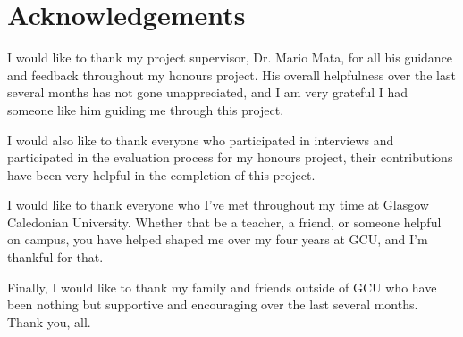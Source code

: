 \documentclass[12pt]{article}
\begin{document}
\newpage

\section*{Acknowledgements}
I would like to thank my project supervisor, Dr. Mario Mata, for all his guidance and feedback throughout my honours project. His overall helpfulness over the last several months
has not gone unappreciated, and I am very grateful I had someone like him guiding me through this project. \newline

I would also like to thank everyone who participated in interviews and participated in the evaluation process for my honours project, their contributions have been very helpful in
the completion of this project. \newline

I would like to thank everyone who I've met throughout my time at Glasgow Caledonian University. Whether that be a teacher, a friend, or someone helpful on campus, you have helped shaped
me over my four years at GCU, and I'm thankful for that. \newline

Finally, I would like to thank my family and friends outside of GCU who have been nothing but supportive and encouraging over the last several months. Thank you, all.

\newpage
\tableofcontents
\listoffigures
\listoftables
\lstlistoflistings
\newpage
\end{document}
